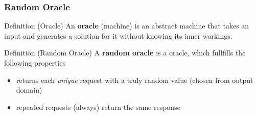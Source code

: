 \begin{frame}
	\frametitle{Random Oracle}

	\begin{block}{Definition (Oracle)}
		An \textbf{oracle} (machine) is an abstract machine that takes an input and generates a solution for it without knowing its inner workings.
	\end{block}
	\begin{block}{Definition (Random Oracle)}
		A \textbf{random oracle} is a oracle, which fullfills the following properties
		\begin{itemize}
			\item returns each \textit{unique} request with a truly random value (chosen from output domain)
			\item repeated requests (always) return the same response
		\end{itemize}
	\end{block}
\end{frame}